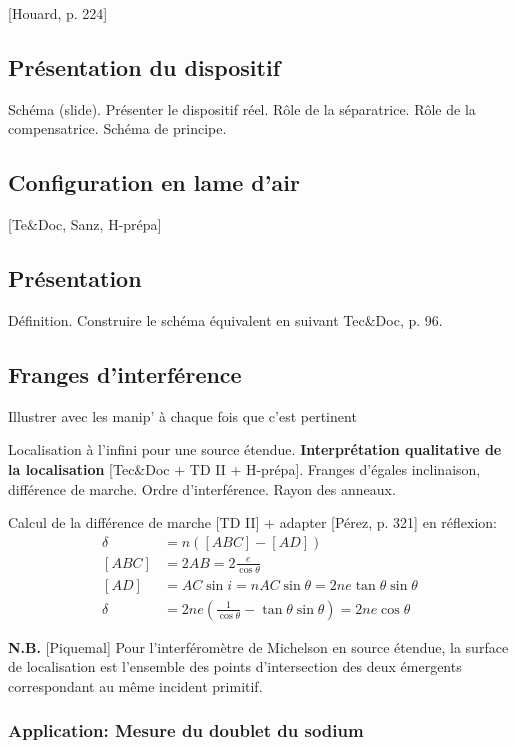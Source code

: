 \documentclass[11pt]{report}
\numberwithin{figure}{section}
\numberwithin{equation}{section}
\numberwithin{table}{section}
\newcommand{\1}{\boldsymbol{1}}
\begin{document}
[Houard, p. 224]

\subsection{Présentation du dispositif}

Schéma (slide). Présenter le dispositif réel. Rôle de la séparatrice. Rôle de la compensatrice. Schéma de principe.

\subsection{Configuration en lame d'air}

[Te\&Doc, Sanz, H-prépa]

\subsection{Présentation}

Définition. Construire le schéma équivalent en suivant Tec\&Doc, p. 96.

\subsection{Franges d'interférence}

\textcolor{mycolor5}{Illustrer avec les manip' à chaque fois que c'est pertinent}

Localisation à l'infini pour une source étendue. \textbf{Interprétation qualitative de la localisation} [Tec\&Doc + TD II + H-prépa]. Franges d'égales inclinaison, différence de marche. Ordre d'interférence. Rayon des anneaux.

Calcul de la différence de marche [TD II] + adapter [Pérez, p. 321] en réflexion:
\begin{align*}
\delta &= n ([ABC] - [AD]) \\
[ABC] &= 2 AB = 2 \frac{e}{\cos \theta} \\
[AD] &= AC \sin i = n AC \sin \theta = 2n e \tan \theta \sin \theta \\
\delta &= 2 n e\left(\frac{1}{\cos \theta} - \tan \theta \sin \theta\right) = 2 n e \cos \theta
\end{align*}

\textbf{N.B.} [Piquemal] Pour l’interféromètre de Michelson en source étendue, la surface de localisation est
l’ensemble des points d’intersection des deux émergents correspondant au même
incident primitif.

\subsubsection{Application: Mesure du doublet du sodium}
\end{document}
